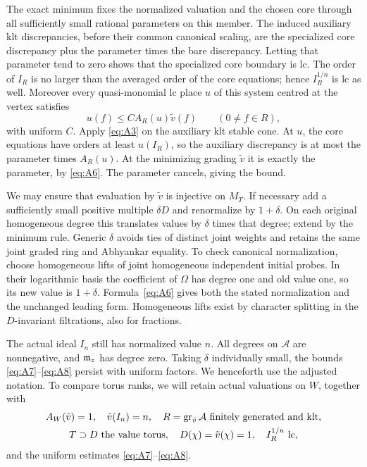 The exact minimum fixes the normalized valuation and the chosen core
through all sufficiently small rational parameters on this member.
The induced auxiliary klt discrepancies, before their common canonical
scaling, are the specialized core discrepancy plus the parameter times
the bare discrepancy. Letting that parameter tend to zero shows that
the specialized core boundary is lc. The order of \(I_R\) is no larger
than the averaged order of the core equations; hence \(I_R^{1/n}\) is
lc as well. Moreover every quasi-monomial lc place \(u\) of this system
centred at the vertex satisfies
\begin{equation}
             u(f)\leq C A_R(u)\tilde v(f)
                        \qquad(0\ne f\in R),
 \label{eq:A8}
\end{equation}
with uniform \(C\). Apply \eqref{eq:A3} on the auxiliary klt stable
cone. At \(u\), the core equations have orders at least \(u(I_R)\),
so the auxiliary discrepancy is at most the parameter times \(A_R(u)\).
At the minimizing grading \(\tilde v\) it is exactly the parameter,
by \eqref{eq:A6}. The parameter cancels, giving the bound.

We may ensure that evaluation by \(\tilde v\) is injective on \(M_T\).
If necessary add a sufficiently small positive multiple \(\delta D\)
and renormalize by \(1+\delta\). On each original homogeneous degree
this translates values by \(\delta\) times that degree; extend by the
minimum rule. Generic \(\delta\) avoids ties of distinct joint weights
and retains the same joint graded ring and Abhyankar equality. To check
canonical normalization, choose homogeneous lifts of joint homogeneous
independent initial probes. In their logarithmic basis the coefficient
of \(\Omega\) has degree one and old value one, so its new value is
\(1+\delta\). Formula~\eqref{eq:A6} gives both the stated normalization
and the unchanged leading form. Homogeneous lifts exist by character
splitting in the \(D\)-invariant filtrations, also for fractions.

The actual ideal \(I_n\) still has normalized value \(n\).
All degrees on \(\mathcal A\) are nonnegative, and \(\mathfrak m_z\) has degree
zero. Taking \(\delta\) individually small, the bounds
\eqref{eq:A7}--\eqref{eq:A8} persist with uniform factors. We henceforth
use the adjusted notation. To compare torus ranks, we will retain actual
valuations on \(W\), together with
\[
 \begin{gathered}
 A_W(\tilde v)=1,\quad \tilde v(I_n)=n,\quad
 R=\operatorname{gr}_{\tilde v}\mathcal A\ \text{finitely generated and klt},\\
 T\supset D\ \text{the value torus},\quad
 D(\chi)=\tilde v(\chi)=1,\quad I_R^{1/n}\ \text{lc},
 \end{gathered}
\]
and the uniform estimates \eqref{eq:A7}--\eqref{eq:A8}.

